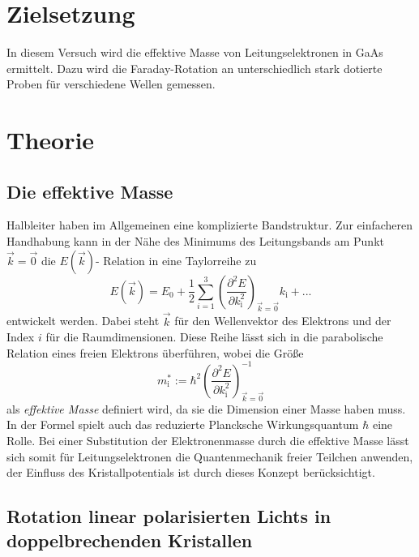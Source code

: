  
\section{Zielsetzung}
\label{sec:Zielsetzung}

In diesem Versuch wird die effektive Masse von Leitungselektronen in
GaAs ermittelt.
Dazu wird die Faraday-Rotation an unterschiedlich stark
dotierte Proben für verschiedene Wellen gemessen.

\section{Theorie}
\label{sec:Theorie}

\subsection{Die effektive Masse}
\label{sec:effMasse}

Halbleiter haben im Allgemeinen eine komplizierte Bandstruktur.
Zur einfacheren Handhabung kann in der Nähe des Minimums des
Leitungsbands am Punkt $\vec{k} = \vec{0}$ die $E\left(\vec{k}\right)$-
Relation in eine Taylorreihe zu
\begin{equation*}
  E\left(\vec{k}\right) = E_\text{0} +
  \frac{1}{2} \sum_{i = 1}^3
  \left(\frac{\partial^2 E}{\partial k_\text{i}^2}\right)_{\vec{k} = \vec{0}}
  k_\text{i} + ...
\end{equation*}
entwickelt werden.
Dabei steht $\vec{k}$ für den Wellenvektor des Elektrons und der Index
$i$ für die Raumdimensionen.
Diese Reihe lässt sich in die parabolische Relation eines freien Elektrons
überführen, wobei die Größe
\begin{equation}
  m_\text{i}^* := \hbar^2
  \left(\frac{\partial^2 E}{\partial k_\text{i}^2}\right)_{\vec{k} = \vec{0}}^{-1}
  \label{eqn:effMasse}
\end{equation}
als \emph{effektive Masse} definiert wird,
da sie die Dimension einer Masse haben muss.
In der Formel spielt auch das reduzierte Plancksche
Wirkungsquantum $\hbar$ eine Rolle.
Bei einer Substitution der Elektronenmasse durch die effektive Masse lässt
sich somit für Leitungselektronen die Quantenmechanik freier Teilchen
anwenden, der Einfluss des Kristallpotentials ist durch dieses
Konzept berücksichtigt.

\subsection{Rotation linear polarisierten Lichts in doppelbrechenden Kristallen}
\label{sec:Theo1}

